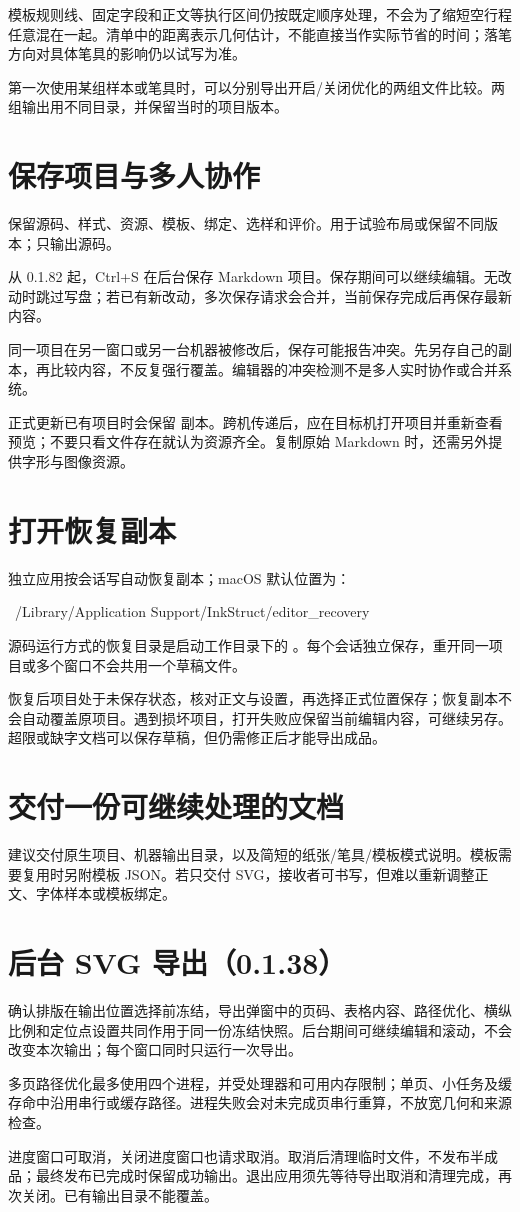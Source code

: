模板规则线、固定字段和正文等执行区间仍按既定顺序处理，不会为了缩短空行程任意混在一起。清单中的距离表示几何估计，不能直接当作实际节省的时间；落笔方向对具体笔具的影响仍以试写为准。

第一次使用某组样本或笔具时，可以分别导出开启/关闭优化的两组文件比较。两组输出用不同目录，并保留当时的项目版本。

\section{保存项目与多人协作}
保留源码、样式、资源、模板、绑定、选样和评价。用于试验布局或保留不同版本；只输出源码。

从 0.1.82 起，Ctrl+S 在后台保存 Markdown 项目。保存期间可以继续编辑。无改动时跳过写盘；若已有新改动，多次保存请求会合并，当前保存完成后再保存最新内容。

同一项目在另一窗口或另一台机器被修改后，保存可能报告冲突。先另存自己的副本，再比较内容，不反复强行覆盖。编辑器的冲突检测不是多人实时协作或合并系统。

正式更新已有项目时会保留  副本。跨机传递后，应在目标机打开项目并重新查看预览；不要只看文件存在就认为资源齐全。复制原始 Markdown 时，还需另外提供字形与图像资源。

\section{打开恢复副本}
独立应用按会话写自动恢复副本；macOS 默认位置为：
\par\noindent\begin{minipage}{\linewidth}
\begin{Source}
~/Library/Application Support/InkStruct/editor_recovery
\end{Source}
\end{minipage}\par\medskip
源码运行方式的恢复目录是启动工作目录下的 。每个会话独立保存，重开同一项目或多个窗口不会共用一个草稿文件。

恢复后项目处于未保存状态，核对正文与设置，再选择正式位置保存；恢复副本不会自动覆盖原项目。遇到损坏项目，打开失败应保留当前编辑内容，可继续另存。超限或缺字文档可以保存草稿，但仍需修正后才能导出成品。

\section{交付一份可继续处理的文档}
建议交付原生项目、机器输出目录，以及简短的纸张/笔具/模板模式说明。模板需要复用时另附模板 JSON。若只交付 SVG，接收者可书写，但难以重新调整正文、字体样本或模板绑定。

\section{后台 SVG 导出（0.1.38）}
确认排版在输出位置选择前冻结，导出弹窗中的页码、表格内容、路径优化、横纵比例和定位点设置共同作用于同一份冻结快照。后台期间可继续编辑和滚动，不会改变本次输出；每个窗口同时只运行一次导出。

多页路径优化最多使用四个进程，并受处理器和可用内存限制；单页、小任务及缓存命中沿用串行或缓存路径。进程失败会对未完成页串行重算，不放宽几何和来源检查。

进度窗口可取消，关闭进度窗口也请求取消。取消后清理临时文件，不发布半成品；最终发布已完成时保留成功输出。退出应用须先等待导出取消和清理完成，再次关闭。已有输出目录不能覆盖。
